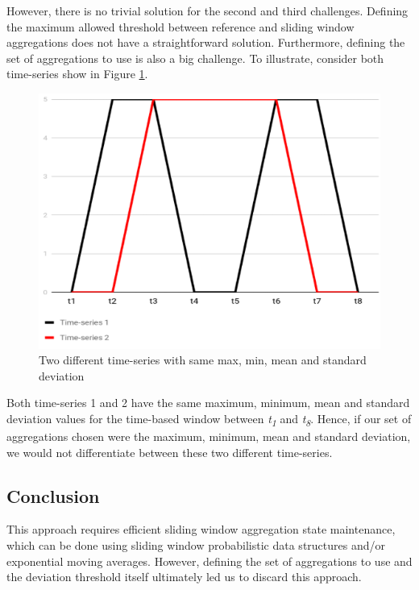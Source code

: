 However, there is no trivial solution for the second and third challenges. Defining the maximum allowed threshold between reference and sliding window aggregations does not have a straightforward solution. Furthermore, defining the set of aggregations to use is also a big challenge. To illustrate, consider both time-series show in Figure \ref{fig:approach2-timeseries}.
 
\begin{figure}[!htb]
    \begin{center}
      \includegraphics[scale=0.7]{figures/approach2-timeseries.png}
      \caption[]{Two different time-series with same max, min, mean and standard deviation}
      \label{fig:approach2-timeseries}
    \end{center}
\end{figure}


Both time-series 1 and 2 have the same maximum, minimum, mean and standard deviation values for the time-based window between \textit{t\textsubscript{1}} and \textit{t\textsubscript{8}}. Hence, if our set of aggregations chosen were the maximum, minimum, mean and standard deviation, we would not differentiate between these two different time-series.

\subsection*{Conclusion}
This approach requires efficient sliding window aggregation state maintenance, which can be done using sliding window probabilistic data structures and/or exponential moving averages. However, defining the set of aggregations to use and the deviation threshold itself ultimately led us to discard this approach.


